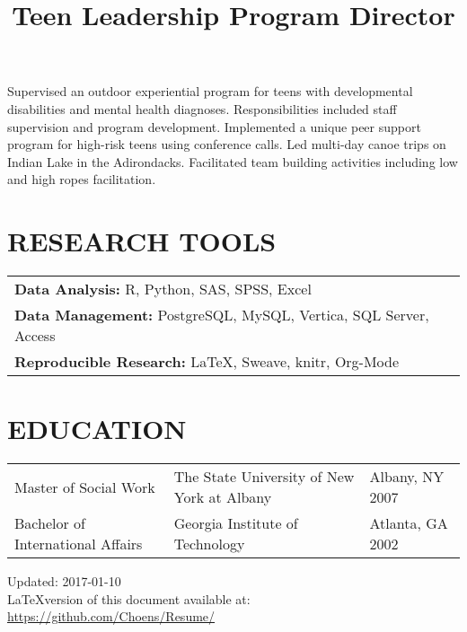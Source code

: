 \documentclass[line, margin, 10pt]{res}
\begin{document}
\begin{resume}
  \title{Teen Leadership Program Director}
  \begin{position}
    Supervised an outdoor experiential program for teens with
    developmental disabilities and mental health
    diagnoses. Responsibilities included staff supervision and program
    development. Implemented a unique peer support program for
    high-risk teens using conference calls. Led multi-day canoe trips
    on Indian Lake in the Adirondacks. Facilitated team building
    activities including low and high ropes facilitation.
  \end{position}

  \section{RESEARCH TOOLS}

  \begin{tabular} {l l}
    {\bf Data Analysis:} R, Python, SAS, SPSS, Excel\\
    {\bf Data Management:} PostgreSQL, MySQL, Vertica, SQL Server, Access\\
    {\bf Reproducible Research:} \LaTeX, Sweave, knitr, Org-Mode\\
  \end{tabular}

  \section{EDUCATION}
  \begin{tabular} {p{1.5in} p{2.125in} p{.75in}}
    Master of Social Work & The State University of New  York at Albany & Albany, NY 2007 \\
    Bachelor of International Affairs & Georgia Institute of
    Technology & Atlanta, GA 2002 
  \end{tabular}

  \vspace{.25in}
  Updated: 2017-01-10 \\
  \LaTeX version of this document available at:
  \href{https://github.com/Choens/Resume/}{https://github.com/Choens/Resume/}

  \vspace{.125in} 

\end{resume}
\end{document}
